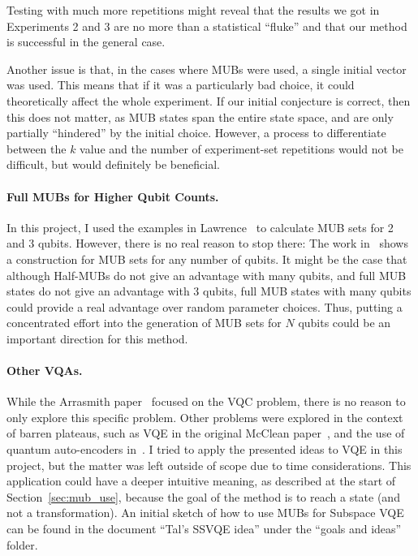 \documentclass[a4paper,12pt]{article}
\begin{document}
Testing with much more repetitions might reveal that the results we got in Experiments 2 and 3 are no more than a statistical ``fluke'' and that our method is successful in the general case.

Another issue is that, in the cases where MUBs were used, a single initial vector was used.
This means that if it was a particularly bad choice, it could theoretically affect the whole experiment.
If our initial conjecture is correct, then this does not matter, as MUB states span the entire state space, and are only partially ``hindered'' by the initial choice.
However, a process to differentiate between the $k$ value and the number of experiment-set repetitions would not be difficult, but would definitely be beneficial.

\paragraph*{Full MUBs for Higher Qubit Counts.}
In this project, I used the examples in Lawrence~\cite{lawrence_mutually_2002} to calculate MUB sets for 2 and 3 qubits. However, there is no real reason to stop there: The work in~\cite{bandyopadhyay_new_2002} shows a construction for MUB sets for any number of qubits.
It might be the case that although Half-MUBs do not give an advantage with many qubits, and full MUB states do not give an advantage with 3 qubits, full MUB states with many qubits could provide a real advantage over random parameter choices.
Thus, putting a concentrated effort into the generation of MUB sets for $N$ qubits could be an important direction for this method.

\paragraph*{Other VQAs.}
While the Arrasmith paper~\cite{arrasmith_effect_2021} focused on the VQC problem, there is no reason to only explore this specific problem.
Other problems were explored in the context of barren plateaus, such as VQE in the original McClean paper~\cite{mcclean_barren_2018}, and the use of quantum auto-encoders in~\cite{cerezo_cost_2021}.
I tried to apply the presented ideas to VQE in this project, but the matter was left outside of scope due to time considerations. This application could have a deeper intuitive meaning, as described at the start of Section~\ref{sec:mub_use}, because the goal of the method is to reach a state (and not a transformation).
An initial sketch of how to use MUBs for Subspace VQE \cite{nakanishi_subspace-search_2019} can be found in the document ``Tal's SSVQE idea'' under the ``goals and ideas'' folder.
\end{document}

